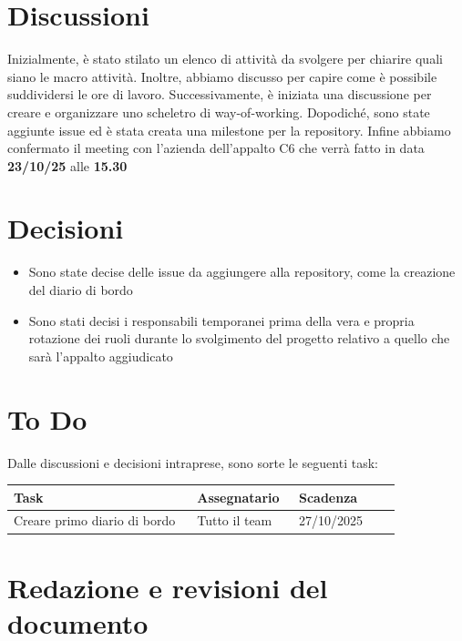 \documentclass[a4paper,12pt]{article}
\begin{document}
\section{Discussioni}
Inizialmente, è stato stilato un elenco di attività da svolgere per chiarire quali siano le macro attività. Inoltre, abbiamo discusso per capire come è possibile suddividersi le ore di lavoro. Successivamente, è iniziata una discussione per creare e organizzare uno scheletro di way-of-working.
Dopodiché, sono state aggiunte issue ed è stata creata una milestone per la repository.
Infine abbiamo confermato il meeting con l'azienda dell'appalto C6 che verrà fatto in data \textbf{23/10/25} alle \textbf{15.30}

\section{Decisioni}
\begin{itemize}
    \item Sono state decise delle issue da aggiungere alla repository, come la creazione del diario di bordo
    \item Sono stati decisi i responsabili temporanei prima della vera e propria rotazione dei ruoli durante lo svolgimento del progetto relativo a quello che sarà l'appalto aggiudicato
\end{itemize}

\section{To Do}
Dalle discussioni e decisioni intraprese, sono sorte le seguenti task:

\begin{center}
\small
\renewcommand{\arraystretch}{1.2} 
\begin{tabular}{|p{0.45\linewidth}|p{0.25\linewidth}|p{0.25\linewidth}|}
\hline
\rowcolor{gray!60} 
\textbf{Task} & \textbf{Assegnatario} & \textbf{Scadenza} \\
\hline
\rowcolor{white}
Creare primo diario di bordo & Tutto il team & 27/10/2025 \\
\hline
\end{tabular}
\end{center}

\clearpage
\section{Redazione e revisioni del documento}
\end{document}
